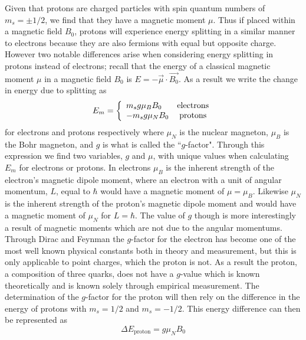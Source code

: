 \documentclass[prb,preprint]{revtex4-1}
\begin{document}
Given that protons are charged particles with spin quantum numbers of $m_s=\pm1/2$, we find that they have a magnetic moment $\mu$. Thus if placed within a magnetic field $B_0$, protons will experience energy splitting in a similar manner to electrons because they are also fermions with equal but opposite charge. However two notable differences arise when considering energy splitting in protons instead of electrons; recall that the energy of a classical magnetic moment $\mu$ in a magnetic field $B_0$ is $E=-\vec{\mu}\cdot\vec{B_0}$. As a result we write the change in energy due to splitting as 
\begin{equation}\label{Em}
E_m = \left\{
  \begin{array}{l c}
    m_s g\mu_BB_0 & \text{electrons}\\
    -m_s g\mu_NB_0 & \text{protons}
  \end{array}
\right.
\end{equation}
for electrons and protons respectively where $\mu_N$ is the nuclear magneton, $\mu_B$ is the Bohr magneton, and $g$ is what is called the ``$g$-factor". Through this expression we find two variables, $g$ and $\mu$, with unique values when calculating $E_m$ for electrons or protons. In electrons $\mu_B$ is the inherent strength of the electron's magnetic dipole moment, where an electron with a unit of angular momentum, $L$, equal to $\hbar$ would have a magnetic moment of $\mu=\mu_B$. Likewise $\mu_N$ is the inherent strength of the proton's magnetic dipole moment and would have a magnetic moment of $\mu_N$ for $L=\hbar$. The value of $g$ though is more interestingly a result of magnetic moments which are not due to the angular momentums. Through Dirac and Feynman the $g$-factor for the electron has become one of the most well known physical constants both in theory and measurement, but this is only applicable to point charges, which the proton is not. As a result the proton, a composition of three quarks, does not have a $g$-value which is known theoretically and is known solely through empirical measurement. The determination of the $g$-factor for the proton will then rely on the difference in the energy of protons with $m_s=1/2$ and $m_s=-1/2$. This energy difference can then be represented as
\begin{equation}\label{deltE}
\Delta E_{\text{proton}}= g\mu_NB_0
\end{equation}
\end{document}
